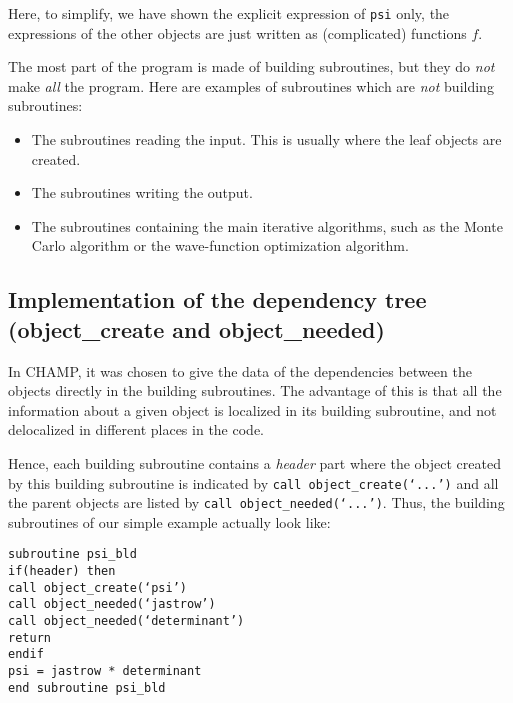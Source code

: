 \documentclass[a4paper,11pt]{article}
\begin{document}
\vspace{0.5cm}
\noindent
Here, to simplify, we have shown the explicit expression of {\tt psi} only, the expressions of the other objects are just written as (complicated) functions $f$.

\vspace{0.5cm}
The most part of the program is made of building subroutines, but they do {\it not} make {\it all} the program. Here are examples of subroutines which are {\it not} building subroutines:
\begin{itemize}
\item The subroutines reading the input. This is usually where the leaf objects are created.
\item The subroutines writing the output.
\item The subroutines containing the main iterative algorithms, such as the Monte Carlo algorithm or the wave-function optimization algorithm.
\end{itemize}

\subsection{Implementation of the dependency tree (object_create and object_needed)}

In CHAMP, it was chosen to give the data of the dependencies between the objects directly in the building subroutines. The advantage of this is that all the information about a given object is localized in its building subroutine, and not delocalized in different places in the code.

Hence, each building subroutine contains a {\it header} part where the object created by this building subroutine is indicated by {\tt call object_create(`...')} and all the parent objects are listed by {\tt call object_needed(`...')}. Thus, the building subroutines of our simple example actually look like:

\vspace{0.5cm}
\noindent
{\tt subroutine psi_bld\\
if(header) then\\
\phantom{xx} call object_create(`psi')\\
\phantom{xx} call object_needed(`jastrow')\\
\phantom{xx} call object_needed(`determinant')\\
\phantom{xx} return\\
endif\\
psi = jastrow * determinant\\
end subroutine psi_bld}
\end{document}

